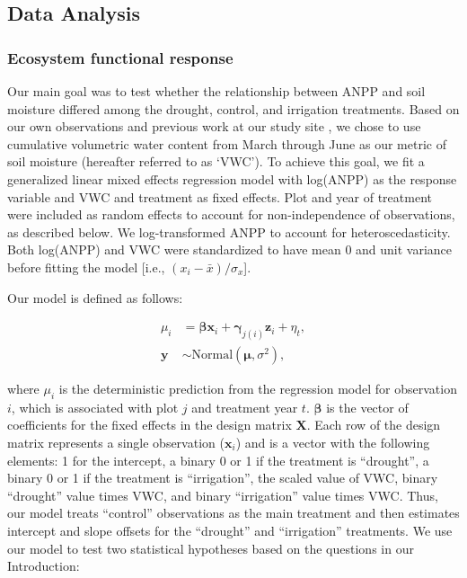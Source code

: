 \documentclass[fleqn,10pt,lineno]{wlpeerj} %
\begin{document}
\subsection{Data Analysis}\label{data-analysis}

\subsubsection{Ecosystem functional
response}\label{ecosystem-functional-response}

Our main goal was to test whether the relationship between ANPP and soil
moisture differed among the drought, control, and irrigation treatments.
Based on our own observations and previous work at our study site
\citep{Blaisdell1958, Dalgleish2011, Adler2012}, we chose to use
cumulative volumetric water content from March through June as our
metric of soil moisture (hereafter referred to as `VWC'). To achieve
this goal, we fit a generalized linear mixed effects regression model
with log(ANPP) as the response variable and VWC and treatment as fixed
effects. Plot and year of treatment were included as random effects to
account for non-independence of observations, as described below. We
log-transformed ANPP to account for heteroscedasticity. Both log(ANPP)
and VWC were standardized to have mean 0 and unit variance before
fitting the model {[}i.e., \((x_i - \bar{x})/\sigma_x\){]}.

Our model is defined as follows:

\vspace{-2em}

\begin{align}
\mu_{i} &= \boldsymbol{\beta}\textbf{x}_i + \boldsymbol{\gamma}_{j(i)}\textbf{z}_i + \eta_t, \\
\textbf{y} &\sim \text{Normal} \left(\boldsymbol{\mu}, \sigma^2 \right),
\end{align}

\noindent{}where \(\mu_{i}\) is the deterministic prediction from the
regression model for observation \(i\), which is associated with plot
\(j\) and treatment year \(t\). \(\boldsymbol{\beta}\) is the vector of
coefficients for the fixed effects in the design matrix \(\textbf{X}\).
Each row of the design matrix represents a single observation
(\(\textbf{x}_i\)) and is a vector with the following elements: 1 for
the intercept, a binary 0 or 1 if the treatment is ``drought'', a binary
0 or 1 if the treatment is ``irrigation'', the scaled value of VWC,
binary ``drought'' value times VWC, and binary ``irrigation'' value
times VWC. Thus, our model treats ``control'' observations as the main
treatment and then estimates intercept and slope offsets for the
``drought'' and ``irrigation'' treatments. We use our model to test two
statistical hypotheses based on the questions in our Introduction:
\end{document}
